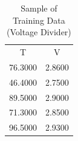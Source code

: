 \begin{table}[H]
\centering
\caption{Sample of Training Data (Voltage Divider)}
\label{table:voltage_divider_training_table}
\begin{tabular}{cc}

      T &      V \\

76.3000 & 2.8600 \\
46.4000 & 2.7500 \\
89.5000 & 2.9000 \\
71.3000 & 2.8500 \\
96.5000 & 2.9300 \\

\end{tabular}
\end{table}
